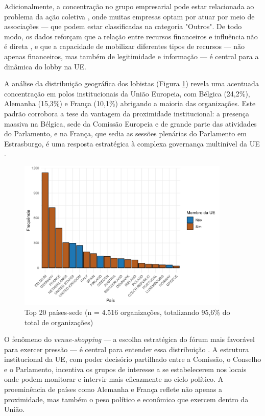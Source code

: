 Adicionalmente, a concentração no grupo empresarial pode estar relacionada ao problema da ação coletiva \cite{olson1971logic}, onde muitas empresas optam por atuar por meio de associações — que podem estar classificadas na categoria "Outros". De todo modo, os dados reforçam que a relação entre recursos financeiros e influência não é direta \cite{simon_notes_1953}, e que a capacidade de mobilizar diferentes tipos de recursos — não apenas financeiros, mas também de legitimidade e informação \cite{Coen2019} — é central para a dinâmica do lobby na UE.


A análise da distribuição geográfica dos lobistas (Figura \ref{fig:country_distribution}) revela uma acentuada concentração em polos institucionais da União Europeia, com Bélgica (24,2\%), Alemanha (15,3\%) e França (10,1\%) abrigando a maioria das organizações. Este padrão corrobora a tese da vantagem da proximidade institucional: a presença massiva na Bélgica, sede da Comissão Europeia e de grande parte das atividades do Parlamento, e na França, que sedia as sessões plenárias do Parlamento em Estrasburgo, é uma resposta estratégica à complexa governança multinível da UE \cite{richardson2000government}.

\begin{figure}[!htbp]
\centering
\includegraphics[width=0.9\textwidth]{figures/descriptives_lobbyists/barplot_country_distribution.png}
\caption{Top 20 países-sede (n = 4.516 organizações, totalizando 95,6\% do total de organizações)}
\label{fig:country_distribution}
\end{figure}

O fenômeno do \textit{venue-shopping} — a escolha estratégica do fórum mais favorável para exercer pressão — é central para entender essa distribuição \cite{kluver2015legislative}. A estrutura institucional da UE, com poder decisório partilhado entre a Comissão, o Conselho e o Parlamento, incentiva os grupos de interesse a se estabelecerem nos locais onde podem monitorar e intervir mais eficazmente no ciclo político. A proeminência de países como Alemanha e França reflete não apenas a proximidade, mas também o peso político e econômico que exercem dentro da União.

